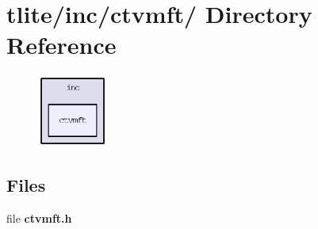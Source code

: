 \section{tlite/inc/ctvmft/ Directory Reference}
\label{dir_ed9a999096487921044ac19703e1c921}


\begin{figure}[H]
\begin{center}
\leavevmode
\includegraphics[width=65pt]{dir_ed9a999096487921044ac19703e1c921_dep}
\end{center}
\end{figure}
\subsection*{Files}
\begin{CompactItemize}
\item 
file \textbf{ctvmft.h}
\end{CompactItemize}
